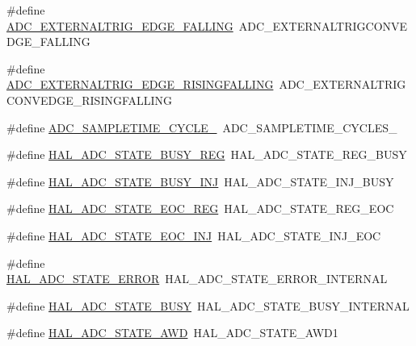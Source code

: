 \begin{DoxyCompactItemize}
\item 
\#define \hyperlink{group___h_a_l___a_d_c___aliased___defines_ga0b539c9290d819da8932016f4a4ca2a1}{A\+D\+C\+\_\+\+E\+X\+T\+E\+R\+N\+A\+L\+T\+R\+I\+G\+\_\+\+E\+D\+G\+E\+\_\+\+F\+A\+L\+L\+I\+NG}~A\+D\+C\+\_\+\+E\+X\+T\+E\+R\+N\+A\+L\+T\+R\+I\+G\+C\+O\+N\+V\+E\+D\+G\+E\+\_\+\+F\+A\+L\+L\+I\+NG
\item 
\#define \hyperlink{group___h_a_l___a_d_c___aliased___defines_gaa0c1b4c780d8091fd60f2624ceb2f3a4}{A\+D\+C\+\_\+\+E\+X\+T\+E\+R\+N\+A\+L\+T\+R\+I\+G\+\_\+\+E\+D\+G\+E\+\_\+\+R\+I\+S\+I\+N\+G\+F\+A\+L\+L\+I\+NG}~A\+D\+C\+\_\+\+E\+X\+T\+E\+R\+N\+A\+L\+T\+R\+I\+G\+C\+O\+N\+V\+E\+D\+G\+E\+\_\+\+R\+I\+S\+I\+N\+G\+F\+A\+L\+L\+I\+NG
\item 
\#define \hyperlink{group___h_a_l___a_d_c___aliased___defines_ga5a51fc2613e4af9bd780b00878393cc0}{A\+D\+C\+\_\+\+S\+A\+M\+P\+L\+E\+T\+I\+M\+E\+\_\+C\+Y\+C\+L\+E\+\_}~A\+D\+C\+\_\+\+S\+A\+M\+P\+L\+E\+T\+I\+M\+E\+\_\+C\+Y\+C\+L\+E\+S\+\_
\item 
\#define \hyperlink{group___h_a_l___a_d_c___aliased___defines_ga3bfd5015d60e3116e55ff81e6627f041}{H\+A\+L\+\_\+\+A\+D\+C\+\_\+\+S\+T\+A\+T\+E\+\_\+\+B\+U\+S\+Y\+\_\+\+R\+EG}~H\+A\+L\+\_\+\+A\+D\+C\+\_\+\+S\+T\+A\+T\+E\+\_\+\+R\+E\+G\+\_\+\+B\+U\+SY
\item 
\#define \hyperlink{group___h_a_l___a_d_c___aliased___defines_ga9dc7360fd46380f3149e09780cd8f4b4}{H\+A\+L\+\_\+\+A\+D\+C\+\_\+\+S\+T\+A\+T\+E\+\_\+\+B\+U\+S\+Y\+\_\+\+I\+NJ}~H\+A\+L\+\_\+\+A\+D\+C\+\_\+\+S\+T\+A\+T\+E\+\_\+\+I\+N\+J\+\_\+\+B\+U\+SY
\item 
\#define \hyperlink{group___h_a_l___a_d_c___aliased___defines_ga12555d013385a39ef776f1177420033c}{H\+A\+L\+\_\+\+A\+D\+C\+\_\+\+S\+T\+A\+T\+E\+\_\+\+E\+O\+C\+\_\+\+R\+EG}~H\+A\+L\+\_\+\+A\+D\+C\+\_\+\+S\+T\+A\+T\+E\+\_\+\+R\+E\+G\+\_\+\+E\+OC
\item 
\#define \hyperlink{group___h_a_l___a_d_c___aliased___defines_ga2d1ddc7f0311b8faf6266a3e3c005c28}{H\+A\+L\+\_\+\+A\+D\+C\+\_\+\+S\+T\+A\+T\+E\+\_\+\+E\+O\+C\+\_\+\+I\+NJ}~H\+A\+L\+\_\+\+A\+D\+C\+\_\+\+S\+T\+A\+T\+E\+\_\+\+I\+N\+J\+\_\+\+E\+OC
\item 
\#define \hyperlink{group___h_a_l___a_d_c___aliased___defines_ga83e3447e639d1a9019732255700ac23a}{H\+A\+L\+\_\+\+A\+D\+C\+\_\+\+S\+T\+A\+T\+E\+\_\+\+E\+R\+R\+OR}~H\+A\+L\+\_\+\+A\+D\+C\+\_\+\+S\+T\+A\+T\+E\+\_\+\+E\+R\+R\+O\+R\+\_\+\+I\+N\+T\+E\+R\+N\+AL
\item 
\#define \hyperlink{group___h_a_l___a_d_c___aliased___defines_ga063cc0bfc15747a4c96d2868273a4516}{H\+A\+L\+\_\+\+A\+D\+C\+\_\+\+S\+T\+A\+T\+E\+\_\+\+B\+U\+SY}~H\+A\+L\+\_\+\+A\+D\+C\+\_\+\+S\+T\+A\+T\+E\+\_\+\+B\+U\+S\+Y\+\_\+\+I\+N\+T\+E\+R\+N\+AL
\item 
\#define \hyperlink{group___h_a_l___a_d_c___aliased___defines_ga3147b9039ee1bc08da805d57a5136cd1}{H\+A\+L\+\_\+\+A\+D\+C\+\_\+\+S\+T\+A\+T\+E\+\_\+\+A\+WD}~H\+A\+L\+\_\+\+A\+D\+C\+\_\+\+S\+T\+A\+T\+E\+\_\+\+A\+W\+D1
\end{DoxyCompactItemize}


